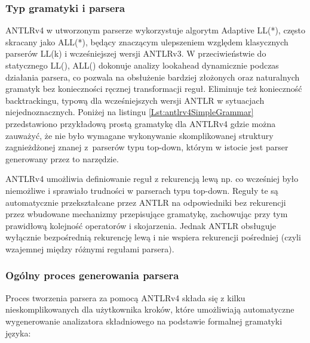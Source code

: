 \documentclass[12pt,twoside]{article}
\begin{document}
\subsubsection{Typ gramatyki i parsera}
ANTLRv4 w utworzonym parserze wykorzystuje algorytm Adaptive LL(*), często skracany jako ALL(*), będący znaczącym ulepszeniem względem klasycznych parserów LL(k) i wcześniejszej wersji ANTLRv3. W przeciwieństwie do statycznego LL(), ALL() dokonuje analizy lookahead dynamicznie podczas działania parsera, co pozwala na obsłużenie bardziej złożonych oraz naturalnych gramatyk bez konieczności ręcznej transformacji reguł.\cite{antlr4GitHub} Eliminuje też konieczność backtrackingu, typową dla wcześniejszych wersji ANTLR w sytuacjach niejednoznacznych\cite{Antlr4Optimisation}. Poniżej na listingu \ref{Lst:antlrv4SimpleGrammar} przedstawiono przykładową prostą gramatykę dla ANTLRv4 gdzie można zauważyć, że nie było wymagane wykonywanie skomplikowanej struktury zagnieżdżonej znanej z~parserów typu top-down\cite{antlr4Book}, którym w istocie jest parser generowany przez to narzędzie.



ANTLRv4 umożliwia definiowanie reguł z rekurencją lewą np.  co wcześniej było niemożliwe i sprawiało trudności w parserach typu top-down. Reguły te są automatycznie przekształcane przez ANTLR na odpowiedniki bez rekurencji przez wbudowane mechanizmy przepisujące gramatykę, zachowując przy tym prawidłową kolejność operatorów i skojarzenia. Jednak ANTLR obsługuje wyłącznie bezpośrednią rekurencję lewą i nie wspiera rekurencji pośredniej (czyli wzajemnej między różnymi regułami parsera).

\subsubsection{Ogólny proces generowania parsera}
Proces tworzenia parsera za pomocą ANTLRv4 składa się z kilku nieskomplikowanych dla użytkownika kroków, które umożliwiają automatyczne wygenerowanie analizatora składniowego na podstawie formalnej gramatyki języka:
\end{document}
